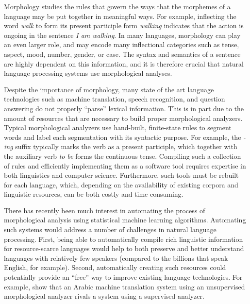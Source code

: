 Morphology studies the rules that govern the ways that the morphemes
of a language may be put together in meaningful ways. For example,
inflecting the word \textit{walk} to form its present participle form
\textit{walking} indicates that the action is ongoing in the sentence
\textit{I am walking}. In many languages, morphology can play an even
larger role, and may encode many inflectional categories such as
tense, aspect, mood, number, gender, or case. The syntax and semantics
of a sentence are highly dependent on this information, and it is
therefore crucial that natural language processing systems use
morphological analyses.

Despite the importance of morphology, many state of the art language
technologies such as machine translation, speech recognition, and
question answering do not properly ``parse'' lexical information. This
is in part due to the amount of resources that are necessary to build
proper morphological analyzers. Typical morphological analyzers use
hand-built, finite-state rules to segment words and label each
segmentation with its syntactic purpose. For example, the
\textit{-ing} suffix typically marks the verb as a present participle,
which together with the auxiliary verb \textit{to be} forms the
continuous tense. Compiling such a collection of rules and efficiently
implementing them as a software tool requires expertise in both
linguistics and computer science. Furthermore, such tools must be
rebuilt for each language, which, depending on the availability of
existing corpora and linguistic resources, can be both costly and time
consuming.

There has recently been much interest in automating the process of
morphological analysis using statistical machine learning
algorithms. Automating such systems would address a number of
challenges in natural language processing. First, being able to
automatically compile rich linguistic information for resource-scarce
languages would help to both preserve and better understand languages
with relatively few speakers (compared to the billions that speak
English, for example). Second, automatically creating such resources
could potentially provide an ``free'' way to improve existing language
technologies. For example, \cite{stallard2012} show that an Arabic
machine translation system using an unsupervised morphological
analyzer rivals a system using a supervised analyzer.
